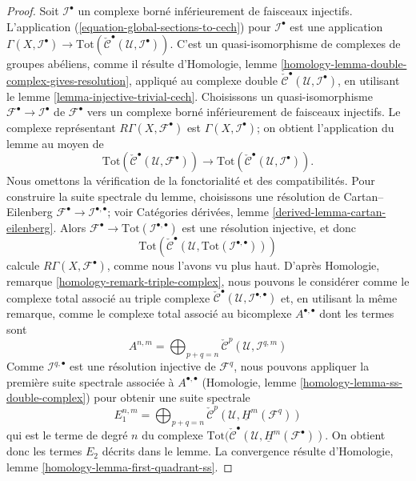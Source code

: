 \begin{proof}

Soit ${\mathcal I}^\bullet$ un complexe borné inférieurement de faisceaux injectifs. L'application (\ref{equation-global-sections-to-cech}) pour
$\mathcal{I}^\bullet$ est une application
$\Gamma(X, {\mathcal I}^\bullet) \to
\text{Tot}(\check{\mathcal{C}}^\bullet({\mathcal U}, {\mathcal I}^\bullet))$. C'est un quasi-isomorphisme de complexes de groupes abéliens, comme il résulte d'Homologie, lemme \ref{homology-lemma-double-complex-gives-resolution},
appliqué au complexe double
$\check{\mathcal{C}}^\bullet({\mathcal U}, {\mathcal I}^\bullet)$, en utilisant le lemme \ref{lemma-injective-trivial-cech}. Choisissons un quasi-isomorphisme ${\mathcal F}^\bullet \to {\mathcal I}^\bullet$ de ${\mathcal F}^\bullet$ vers un complexe borné inférieurement de faisceaux injectifs. Le complexe représentant $R\Gamma(X, {\mathcal F}^\bullet)$ est
$\Gamma(X, {\mathcal I}^\bullet)$; on obtient l'application du lemme au moyen de
$$
\text{Tot}(\check{\mathcal{C}}^\bullet({\mathcal U}, {\mathcal F}^\bullet))
\longrightarrow
\text{Tot}(\check{\mathcal{C}}^\bullet({\mathcal U}, {\mathcal I}^\bullet)).
$$
Nous omettons la vérification de la fonctorialité et des compatibilités. Pour construire la suite spectrale du lemme, choisissons une résolution de Cartan–Eilenberg $\mathcal{F}^\bullet \to \mathcal{I}^{\bullet, \bullet}$; voir Catégories dérivées, lemme \ref{derived-lemma-cartan-eilenberg}. Alors $\mathcal{F}^\bullet \to \text{Tot}(\mathcal{I}^{\bullet, \bullet})$
est une résolution injective, et donc
$$
\text{Tot}(\check{\mathcal{C}}^\bullet({\mathcal U},
\text{Tot}({\mathcal I}^{\bullet, \bullet})))
$$
calcule $R\Gamma(X, \mathcal{F}^\bullet)$, comme nous l'avons vu plus haut. D'après Homologie, remarque \ref{homology-remark-triple-complex},
nous pouvons le considérer comme le complexe total associé au triple complexe
$\check{\mathcal{C}}^\bullet({\mathcal U}, {\mathcal I}^{\bullet, \bullet})$
et, en utilisant la même remarque, comme le complexe total associé au bicomplexe $A^{\bullet, \bullet}$ dont les termes sont
$$
A^{n, m} =
\bigoplus\nolimits_{p + q = n}
\check{\mathcal{C}}^p({\mathcal U}, \mathcal{I}^{q, m})
$$
Comme $\mathcal{I}^{q, \bullet}$ est une résolution injective de
$\mathcal{F}^q$, nous pouvons appliquer la première suite spectrale associée à
$A^{\bullet, \bullet}$
(Homologie, lemme \ref{homology-lemma-ss-double-complex}) pour obtenir une suite spectrale
$$
E_1^{n, m} =
\bigoplus\nolimits_{p + q = n}
\check{\mathcal{C}}^p(\mathcal{U}, \underline{H}^m(\mathcal{F}^q))
$$
qui est le terme de degré $n$ du complexe
$\text{Tot}(\check{\mathcal{C}}^\bullet(\mathcal{U},
\underline{H}^m(\mathcal{F}^\bullet))$. On obtient donc
les termes $E_2$ décrits dans le lemme. La convergence résulte d'Homologie, lemme \ref{homology-lemma-first-quadrant-ss}.

\end{proof}


